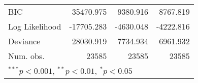 \begin{tabular}{l D{)}{)}{13)3} D{)}{)}{13)3} D{)}{)}{13)3} }
BIC                                & 35470.975               & 9380.916                & 8767.819                \\
Log Likelihood                     & -17705.283              & -4630.048               & -4222.816               \\
Deviance                           & 28030.919               & 7734.934                & 6961.932                \\
Num. obs.                          & 23585                   & 23585                   & 23585                   \\
\bottomrule
{}
\end{tabular}

